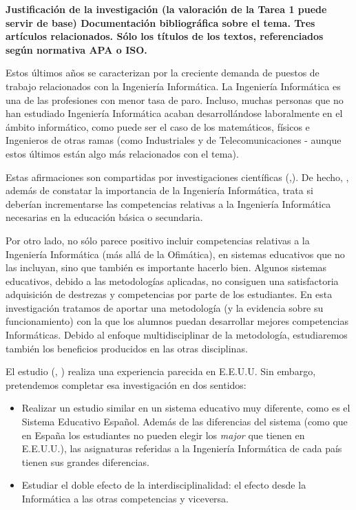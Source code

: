 \documentclass[palatino,nochap]{apuntesURJC}
\def\citeapos#1{\citetitle{#1} (\citeauthor{#1}, \citeyear{#1}) \cite{#1}}
\begin{document}
\textbf{Justificación de la investigación (la valoración de la Tarea 1 puede servir de base)
%
Documentación bibliográfica sobre el tema.
%
Tres artículos relacionados. 
%
Sólo los títulos de los textos, referenciados según normativa APA o ISO.}


Estos últimos años se caracterizan por la creciente demanda de puestos de trabajo relacionados con la Ingeniería Informática.
%
La Ingeniería Informática es una de las profesiones con menor tasa de paro. 
%
Incluso, muchas personas que no han estudiado Ingeniería Informática acaban desarrollándose laboralmente en el ámbito informático, como puede ser el caso de los matemáticos, físicos e Ingenieros de otras ramas (como Industriales y de Telecomunicaciones - aunque estos últimos están algo más relacionados con el tema).

Estas afirmaciones son compartidas por investigaciones científicas (\cite{CSIsImportant},\cite{CSArguing}). 
%
De hecho, \cite{CSArguing}, además de constatar la importancia de la Ingeniería Informática, trata si deberían incrementarse las competencias relativas a la Ingeniería Informática necesarias en la educación básica o secundaria.

Por otro lado, no sólo parece positivo incluir competencias relativas a la Ingeniería Informática (más allá de la Ofimática), en sistemas educativos que no las incluyan, sino que también es importante hacerlo bien.
%
Algunos sistemas educativos, debido a las metodologías aplicadas, no consiguen una satisfactoria adquisición de destrezas y competencias por parte de los estudiantes.
%
En esta investigación tratamos de aportar una metodología (y la evidencia sobre su funcionamiento) con la que los alumnos puedan desarrollar mejores competencias Informáticas. 
%
Debido al enfoque multidisciplinar de la metodología, estudiaremos también los beneficios producidos en las otras disciplinas.

El estudio \citeapos{Interdiscipline} realiza una experiencia parecida en E.E.U.U. Sin embargo, pretendemos completar esa investigación en dos sentidos: 
\begin{itemize}
	\item Realizar un estudio similar en un sistema educativo muy diferente, como es el Sistema Educativo Español. 
	Además de las diferencias del sistema (como que en España los estudiantes no pueden elegir los \textit{major} que tienen en E.E.U.U.), las asignaturas referidas a la Ingeniería Informática de cada país tienen sus grandes diferencias.
	\item Estudiar el doble efecto de la interdisciplinalidad: el efecto desde la Informática a las otras competencias y viceversa.
\end{itemize}
\end{document}
